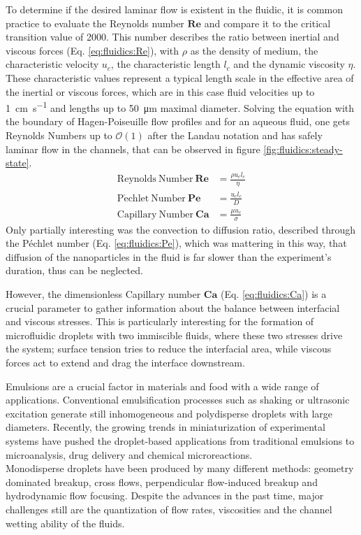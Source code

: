 To determine if the desired laminar flow is existent in the fluidic, it is common practice to evaluate the Reynolds number $\mathbf{Re}$ and compare it to the critical transition value of 2000.\cite{lit:fluidic:microfluidics_review} This number describes the ratio between inertial and viscous forces (Eq. \ref{eq:fluidics:Re}), with $\rho$ as the density of medium, the characteristic velocity $u_c$, the characteristic length $l_c$ and the dynamic viscosity $\eta$. These characteristic values represent a typical length scale in the effective area of the inertial or viscous forces, which are in this case fluid velocities up to \SI{1}{\centi\meter\per\second} and lengths up to \SI{50}{\micro\meter} maximal diameter. Solving the equation with the boundary of Hagen-Poiseuille flow profiles and for an aqueous fluid, one gets Reynolds Numbers up to $\mathcal{O}(1)$ after the Landau notation and has safely laminar flow in the channels, that can be observed in figure \ref{fig:fluidics:steady-state}.
\begin{align}
 \mathrm{Reynolds\ Number}\ \mathbf{Re} &= \frac{\rho u_c  l_c}{\eta}
 \label{eq:fluidics:Re}\\
  \mathrm{P\acute{e}chlet\ Number}\ \mathbf{Pe} &= \frac{u_c l_c}{D}
 \label{eq:fluidics:Pe}\\
 \mathrm{Capillary\ Number}\ \mathbf{Ca} &= \frac{\mu u_c}{\sigma}
 \label{eq:fluidics:Ca}
\end{align}
Only partially interesting was the convection to diffusion ratio, described through the P\'{e}chlet number (Eq. \ref{eq:fluidics:Pe}), which was mattering in this way, that diffusion of the nanoparticles in the fluid is far slower than the experiment's duration, thus can be neglected.

However, the dimensionless Capillary number $\mathbf{Ca}$ (Eq. \ref{eq:fluidics:Ca}) is a crucial parameter to gather information about the balance between interfacial and viscous stresses. This is particularly interesting for the formation of microfluidic droplets with two immiscible fluids, where these two stresses drive the system; surface tension tries to reduce the interfacial area, while viscous forces act to extend and drag the interface downstream.\cite{lit:fluidic:microfluidics_review}

Emulsions are a crucial factor in materials and food with a wide range of applications. Conventional emulsification processes such as shaking or ultrasonic excitation generate still inhomogeneous and polydisperse droplets with large diameters. Recently, the growing trends in miniaturization of experimental systems have pushed the droplet-based applications from traditional emulsions to microanalysis, drug delivery and chemical microreactions.\\
Monodisperse droplets have been produced by many different methods: geometry dominated breakup, cross flows, perpendicular flow-induced breakup and hydrodynamic flow focusing. Despite the advances in the past time, major challenges still are the quantization of flow rates, viscosities and the channel wetting ability of the fluids. \cite{lit:fluidics:monodisperseDroplets}

